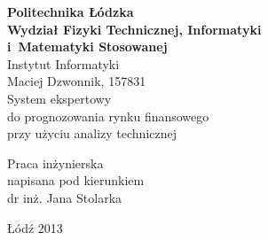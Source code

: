 \begin{titlepage}
\begin{center}
\textbf{{\large Politechnika Łódzka}\\}
\vspace{\medskipamount}
\textbf{\large Wydział Fizyki Technicznej, Informatyki\\i~Matematyki Stosowanej}
\vspace{\medskipamount}\\
{\large Instytut Informatyki}\\
\vspace{2.5cm}
{\Large {Maciej Dzwonnik, 157831\\}}
\vspace{2cm}
{\huge{ {System ekspertowy \\do prognozowania rynku finansowego \\przy użyciu analizy technicznej\\}}}
\end{center}
\vspace{3cm}
\hfill
\begin{minipage}{.55\columnwidth}
Praca {inżynierska}\\
napisana pod kierunkiem\\
dr inż. Jana Stolarka
\end{minipage}
\vfill
\begin{center}
Łódź {2013}
\end{center}
\end{titlepage}
